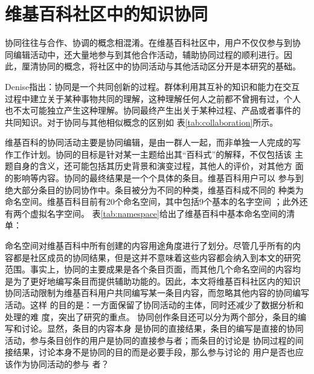 \section{维基百科社区中的知识协同}
协同往往与合作、协调的概念相混淆。在维基百科社区中，用户不仅仅参与到协
同编辑活动中，还大量地参与到其他合作活动，辅助协同过程的顺利进行。因
此，厘清协同的概念，将社区中的协同活动与其他活动区分开是本研究的基础。

Denise指出：协同是一个共同创新的过程。群体利用其互补的知识和能力在交互
过程中建立关于某种事物共同的理解，这种理解任何人之前都不曾拥有过，个人
也不太可能独立产生这种理解。协同最终产生出关于某种过程、产品或者事件的
共同知识\cite{denise1999collaboration}。对于协同与其他相似概念的区别如
表\ref{tab:collaboration}所示。


维基百科的协同活动主要是协同编辑，是由一群人一起，而非单独一人完成的写
作工作计划。协同的目标是针对某一主题给出其“百科式”的解释，不仅包括该
主题自身的含义，还可能包括其历史背景和演变过程，其他人的评价，对其他方
面的影响等内容。协同的最终结果是一个个具体的条目。维基百科用户可以
参与到绝大部分条目的协同协作中。条目被分为不同的种类，维基百科成不同的
种类为命名空间。维基百科目前有20个命名空间，其中包括9个基本的名字空间
；此外还有两个虚拟名字空间。
表\ref{tab:namespace}给出了维基百科中基本命名空间的清单：


命名空间对维基百科中所有创建的内容用途角度进行了划分。尽管几乎所有的内
容都是社区成员的协同结果，但是这并不意味着这些内容都会纳入到本文的研究
范围。事实上，协同的主要成果是各个条目页面，而其他几个命名空间的内容均
是为了更好地编写条目而提供辅助功能的。因此，本文将维基百科社区内的知识
协同活动限制为维基百科用户共同编写某一条目内容，而忽略其他内容的协同编写活动。这样
的目的是：一方面保留了协同活动的主体，同时还减少了数据分析和处理的难
度，突出了研究的重点。
协同创作条目还可以分为两个部分，条目的编写和讨论。显然，条目的内容本身
是协同的直接结果，条目的编写是直接的协同活动，参与条目创作的用户是协同的直接参与者；而条目的讨论是
协同过程的间接结果，讨论本身不是协同的目的而是必要手段，那么参与讨论的
用户是否也应该作为协同活动的参与
者？

